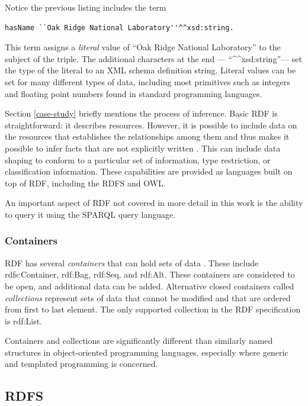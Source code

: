 Notice the previous listing includes the term
\begin{lstlisting}[language=TURTL]
    hasName ``Oak Ridge National Laboratory''^^xsd:string.
\end{lstlisting}
This term assigns a \textit{literal} value of ``Oak Ridge National Laboratory''
to the subject of the triple. The additional characters at the end ---
``\textasciicircum\textasciicircum xsd:string''--- set the type of the literal
to an XML schema definition string. Literal values can be set for many different types of data, including
most primitives such as integers and floating point numbers found in standard
programming languages.

Section \ref{case-study} briefly mentions the process of inference. Basic RDF
is straightforward: it describes resources. However, it is possible to include data
on the resources that establishes the relationships among them and thus makes
it possible to infer facts that are not explicitly written
\cite{allemang_semantic_2008}. This can include data shaping to conform to a
particular set of information, type restriction, or classification information.
These capabilities are provided as languages built on top of RDF, including the
RDFS and OWL.

An important aspect of RDF not covered in more detail in this work is the
ability to query it using the SPARQL query language.

\subsubsection{Containers}

RDF has several \textit{containers} that can hold sets of data
\cite{noauthor_rdf_nodate-3}. These include rdfs:Container, rdf:Bag, rdf:Seq,
and rdf:Alt. These containers are considered to be open, and additional data can
be added. Alternative closed containers called \textit{collections} represent
sets of data that cannot be modified and that are ordered from first to last
element. The only supported collection in the RDF specification is rdf:List.

Containers and collections are significantly different than similarly named
structures in object-oriented programming languages, especially where generic
and templated programming is concerned.

\subsection{RDFS}

